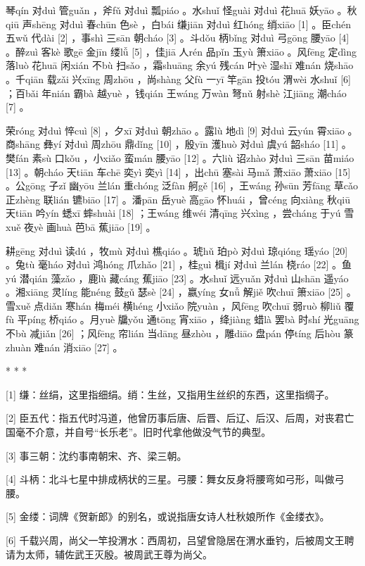 \documentclass[12pt,UTF8]{ctexbook}
\begin{document}
琴qín 对duì 管guǎn ，斧fǔ 对duì 瓢piáo 。水shuǐ 怪guài 对duì 花huā 妖yāo 。秋qiū 声shēng 对duì 春chūn 色sè ，白bái 缣jiān 对duì 红hóng 绡xiāo [1] 。臣chén 五wǔ 代dài [2] ，事shì 三sān 朝cháo [3] 。斗dǒu 柄bǐng 对duì 弓gōng 腰yāo [4] 。醉zuì 客kè 歌gē 金jīn 缕lǚ [5] ，佳jiā 人rén 品pǐn 玉yù 箫xiāo 。风fēng 定dìng 落luò 花huā 闲xián 不bù 扫sǎo ，霜shuāng 余yú 残cán 叶yè 湿shī 难nán 烧shāo 。千qiān 载zǎi 兴xīng 周zhōu ，尚shàng 父fù 一yī 竿gān 投tóu 渭wèi 水shuǐ [6] ；百bǎi 年nián 霸bà 越yuè ，钱qián 王wáng 万wàn 弩nǔ 射shè 江jiāng 潮cháo [7] 。

荣róng 对duì 悴cuì [8] ，夕xī 对duì 朝zhāo 。露lù 地dì [9] 对duì 云yún 霄xiāo 。商shāng 彝yí 对duì 周zhōu 鼎dǐng [10] ，殷yīn 濩huò 对duì 虞yú 韶sháo [11] 。樊fán 素sù 口kǒu ，小xiǎo 蛮mán 腰yāo [12] 。六liù 诏zhào 对duì 三sān 苗miáo [13] 。朝cháo 天tiān 车chē 奕yì 奕yì [14] ，出chū 塞sài 马mǎ 萧xiāo 萧xiāo [15] 。公gōng 子zǐ 幽yōu 兰lán 重chóng 泛fàn 舸gě [16] ，王wáng 孙sūn 芳fāng 草cǎo 正zhèng 联lián 镳biāo [17] 。潘pān 岳yuè 高gāo 怀huái ，曾céng 向xiàng 秋qiū 天tiān 吟yín 蟋xī 蟀shuài [18] ；王wáng 维wéi 清qīng 兴xìng ，尝cháng 于yú 雪xuě 夜yè 画huà 芭bā 蕉jiāo [19] 。

耕gēng 对duì 读dú ，牧mù 对duì 樵qiáo 。琥hǔ 珀pò 对duì 琼qióng 瑶yáo [20] 。兔tù 毫háo 对duì 鸿hóng 爪zhǎo [21] ，桂guì 楫jí 对duì 兰lán 桡ráo [22] 。鱼yú 潜qián 藻zǎo ，鹿lù 藏cáng 蕉jiāo [23] 。水shuǐ 远yuǎn 对duì 山shān 遥yáo 。湘xiāng 灵líng 能néng 鼓gǔ 瑟sè [24] ，嬴yíng 女nǚ 解jiě 吹chuī 箫xiāo [25] 。雪xuě 点diǎn 寒hán 梅méi 横héng 小xiǎo 院yuàn ，风fēng 吹chuī 弱ruò 柳liǔ 覆fù 平píng 桥qiáo 。月yuè 牖yǒu 通tōng 宵xiāo ，绛jiàng 蜡là 罢bà 时shí 光guāng 不bù 减jiǎn [26] ；风fēng 帘lián 当dāng 昼zhòu ，雕diāo 盘pán 停tíng 后hòu 篆zhuàn 难nán 消xiāo [27] 。



* * *



[1] 缣：丝绢，这里指细绢。绡：生丝，又指用生丝织的东西，这里指绸子。

[2] 臣五代：指五代时冯道，他曾历事后唐、后晋、后辽、后汉、后周，对丧君亡国毫不介意，并自号“长乐老”。旧时代拿他做没气节的典型。

[3] 事三朝：沈约事南朝宋、齐、梁三朝。

[4] 斗柄：北斗七星中排成柄状的三星。弓腰：舞女反身将腰弯如弓形，叫做弓腰。

[5] 金缕：词牌《贺新郎》的别名，或说指唐女诗人杜秋娘所作《金缕衣》。

[6] 千载兴周，尚父一竿投渭水：西周初，吕望曾隐居在渭水垂钓，后被周文王聘请为太师，辅佐武王灭殷。被周武王尊为尚父。
\end{document}
